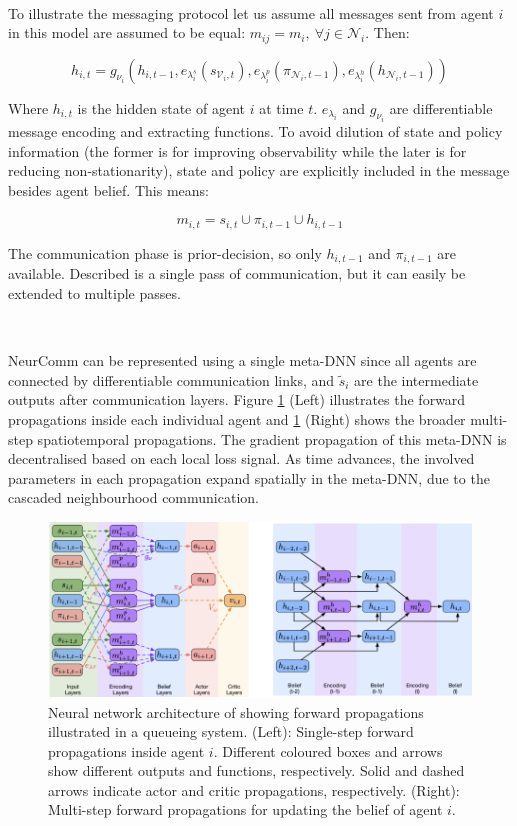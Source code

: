 \documentclass{article}
\begin{document}
\

To illustrate the messaging protocol let us assume all messages sent from agent $i$ in this model are assumed to be equal: $m_{ij} = m_i, \ \forall j \in \mathcal{N}_i$. Then:

\begin{equation}
	h_{i, t} = g_{\nu_i} (h_{i, t-1}, e_{\lambda_i^s}(s_{\mathcal{V}_i, t}), e_{\lambda_i^p}(\pi_{\mathcal{N}_i, t-1}), e_{\lambda_i^h}(h_{\mathcal{N}_i, t-1}))
\end{equation}

Where $h_{i, t}$ is the hidden state of agent $i$ at time $t$. $e_{\lambda_i}$ and $g_{\nu_i}$ are differentiable message encoding and extracting functions. To avoid dilution of state and policy information (the former is for improving observability while the later is for reducing non-stationarity), state and policy are explicitly included in the message besides agent belief. This means:

\begin{equation}
	m_{i,t} = s_{i,t} \cup \pi_{i,t−1} \cup h_{i,t−1}
\end{equation}

The communication phase is prior-decision, so only $h_{i,t−1}$ and $\pi_{i,t−1}$ are available. Described is a single pass of communication, but it can easily be extended to multiple passes. 

\

NeurComm can be represented using a single meta-DNN since all agents are connected by differentiable communication links, and $\tilde{s}_i$ are the intermediate outputs after communication layers. Figure \ref{fig:neurcomm} (Left) illustrates the forward propagations inside each individual agent and \ref{fig:neurcomm} (Right) shows the broader multi-step spatiotemporal propagations. The gradient propagation of this meta-DNN is decentralised based on each local loss signal. As time advances, the involved parameters in each propagation expand spatially in the meta-DNN, due to the cascaded neighbourhood communication.

\begin{figure}
	\centering
	\includegraphics[scale=0.5]{images/neurcomm}
	\caption{Neural network architecture of \citet{chu2020NeurComm} showing forward propagations illustrated in a queueing system. (Left): Single-step forward propagations inside agent $i$. Different coloured boxes and arrows show different outputs and functions, respectively. Solid and dashed arrows indicate actor and critic propagations, respectively. (Right): Multi-step forward propagations for updating the belief of agent $i$.}
	\label{fig:neurcomm}
\end{figure}
\end{document}
